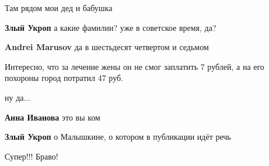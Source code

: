  
 
 
 
 

\qqSecCmt


Там рядом мои дед и бабушка

\begin{itemize} %
\textbf{Злый Укроп} а какие фамилии? уже в советское время, да?

\textbf{Andrei Marusov} да в шестьдесят четвертом и седьмом
\end{itemize} %


Интересно, что за лечение жены он не смог заплатить 7 рублей, а на его похороны
город потратил 47 руб.

\begin{itemize} %
ну да... 🙁

\textbf{Анна Иванова} это вы ком

\textbf{Злый Укроп} о Малышкине, о котором в публикации идёт речь

\end{itemize} %


Супер!!! Браво!
